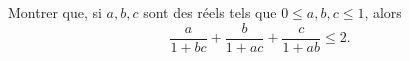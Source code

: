 Montrer que, si $a, b, c$ sont des réels tels que $0 \leq a, b, c \leq 1$, alors
\[ \frac{a}{1 + bc} + \frac{b}{1 + ac} + \frac{c}{1 + ab} \leq 2. \]
